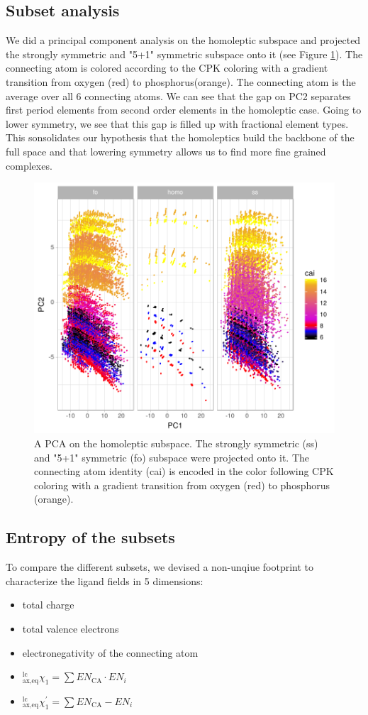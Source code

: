 \subsection{Subset analysis}
We did a principal component analysis on the homoleptic subspace and projected the strongly symmetric and "5+1" symmetric subspace onto it (see Figure \ref{fig:pca}). The connecting atom is colored according to the CPK coloring with a gradient transition from oxygen (red) to phosphorus(orange). The connecting atom is the average over all 6 connecting atoms. We can see that the gap on PC2 separates first period elements from second order elements in the homoleptic case. Going to lower symmetry, we see that this gap is filled up with fractional element types. This sonsolidates our hypothesis that the homoleptics build the backbone of the full space and that lowering symmetry allows us to find more fine grained complexes.

\begin{figure}
\includegraphics[width=0.7\linewidth]{img/pca.pdf}
\centering
\caption{A PCA on the homoleptic subspace. The strongly symmetric (ss) and "5+1" symmetric (fo) subspace were projected onto it. The connecting atom identity (cai) is encoded in the color following CPK coloring with a gradient transition from oxygen (red) to phosphorus (orange).}
\label{fig:pca} 
\end{figure}

\subsection{Entropy of the subsets}
To compare the different subsets, we devised a non-unqiue footprint to characterize the ligand fields in 5 dimensions:
\begin{itemize}
\item total charge
\item total valence electrons
\item electronegativity of the connecting atom
\item $^{\textrm{lc}}_{\textrm{ax,eq}}\chi_1 = \sum{EN_{\textrm{CA}} \cdot EN_i}$
\item $^{\textrm{lc}}_{\textrm{ax,eq}}\chi^\prime_1 = \sum{EN_{\textrm{CA}} - EN_i}$
\end{itemize}

